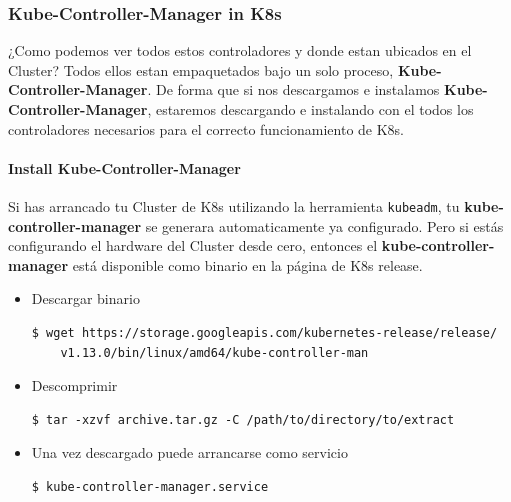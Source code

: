 \documentclass{article}
\newenvironment{codetemplate}[1][]{%
  \mybasecolorbox[#1]
  \itshape
}{%
  \endmybasecolorbox
}
\begin{document}
\subsubsection{Kube-Controller-Manager in K8s}

¿Como podemos ver todos estos controladores y donde estan ubicados en el Cluster? Todos ellos estan empaquetados bajo un solo proceso, \textbf{Kube-Controller-Manager}. De forma que si nos descargamos e instalamos \textbf{Kube-Controller-Manager}, estaremos descargando e instalando con el todos los controladores necesarios para el correcto funcionamiento de K8s.

\paragraph{Install Kube-Controller-Manager}

Si has arrancado tu Cluster de K8s utilizando la herramienta \verb|kubeadm|, tu \textbf{kube-controller-manager} se generara automaticamente ya configurado. Pero si estás configurando el hardware del Cluster desde cero, entonces el \textbf{kube-controller-manager} está disponible como binario en la página de K8s release.

\begin{itemize}
    \item Descargar binario
\begin{codetemplate}{}
\begin{verbatim}
$ wget https://storage.googleapis.com/kubernetes-release/release/
    v1.13.0/bin/linux/amd64/kube-controller-man
\end{verbatim}
\end{codetemplate}

    \item Descomprimir
\begin{codetemplate}{}
\begin{verbatim}
$ tar -xzvf archive.tar.gz -C /path/to/directory/to/extract
\end{verbatim}
\end{codetemplate} 

    \item Una vez descargado puede arrancarse como servicio
\begin{codetemplate}{}
\begin{verbatim}
$ kube-controller-manager.service
\end{verbatim}
\end{codetemplate}
\end{itemize}
\end{document}
